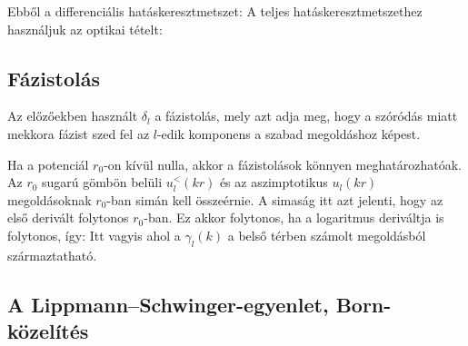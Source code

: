    Ebből a differenciális hatáskeresztmetszet:
   A teljes hatáskeresztmetszethez használjuk az optikai tételt:
   
  \subsection{Fázistolás}
   
   Az előzőekben használt $\delta_l$ a fázistolás, mely azt adja meg, hogy a szóródás miatt mekkora fázist szed fel az $l$-edik komponens a szabad megoldáshoz képest. 
   
   Ha a potenciál $r_0$-on kívül nulla, akkor a fázistolások könnyen meghatározhatóak.  Az $r_0$ sugarú gömbön belüli $u_l^{<}(kr)$ és az aszimptotikus $u_l(kr)$ megoldásoknak $r_0$-ban simán kell összeérnie. A simaság itt azt jelenti, hogy az első derivált folytonos $r_0$-ban. Ez akkor folytonos, ha a logaritmus deriváltja is folytonos, így:
   Itt
   vagyis 
   ahol a $\gamma_l(k)$ a belső térben számolt megoldásból származtatható.
   
  \subsection{A Lippmann--Schwinger-egyenlet, Born-közelítés}
   
